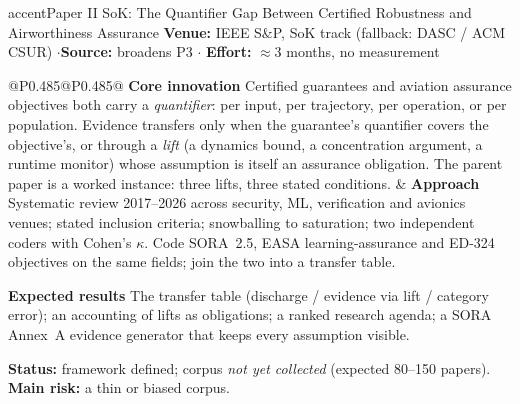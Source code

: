 \documentclass[10pt,a4paper]{article}
\newcommand{\hd}[1]{\textcolor{netcol}{\textbf{#1}}\enspace}
\begin{document}
\begin{card}{accent}{Paper II}
  {SoK: The Quantifier Gap Between Certified Robustness and Airworthiness
   Assurance}
  {}
\textbf{Venue:} IEEE S\&P, SoK track (fallback: DASC / ACM CSUR)
\enspace$\cdot$\enspace \textbf{Source:} broadens P3 \enspace$\cdot$\enspace
\textbf{Effort:} $\approx$3 months, no measurement

\begin{tabularx}{\linewidth}{@{}P{0.485\linewidth}@{\hspace{0.03\linewidth}}P{0.485\linewidth}@{}}
\hd{Core innovation} Certified guarantees and aviation assurance objectives both
carry a \emph{quantifier}: per input, per trajectory, per operation, or per
population. Evidence transfers only when the guarantee's quantifier covers the
objective's, or through a \emph{lift} (a dynamics bound, a concentration
argument, a runtime monitor) whose assumption is itself an assurance obligation.
The parent paper is a worked instance: three lifts, three stated conditions.
&
\hd{Approach} Systematic review 2017--2026 across security, ML, verification and
avionics venues; stated inclusion criteria; snowballing to saturation; two
independent coders with Cohen's $\kappa$. Code SORA~2.5, EASA learning-assurance
and ED-324 objectives on the same fields; join the two into a transfer table.

\hd{Expected results} The transfer table (discharge / evidence via lift /
category error); an accounting of lifts as obligations; a ranked research
agenda; a SORA Annex~A evidence generator that keeps every assumption visible.
\end{tabularx}
\textbf{Status:} framework defined; corpus \emph{not yet collected} (expected
80--150 papers). \textbf{Main risk:} a thin or biased corpus.
\end{card}
\end{document}
